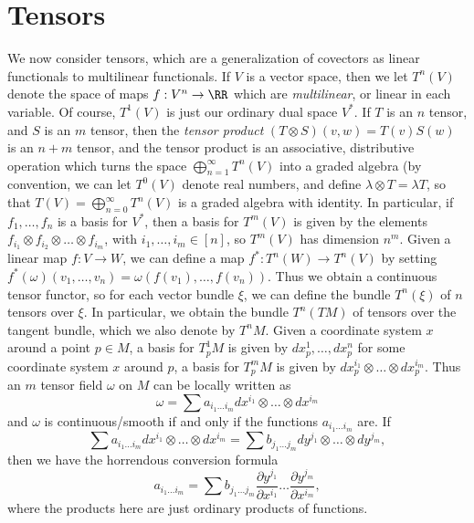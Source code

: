 \section{Tensors}

We now consider tensors, which are a generalization of covectors as linear functionals to multilinear functionals. If $V$ is a vector space, then we let $T^n(V)$ denote the space of maps $f: V^n \to \RR$ which are {\it multilinear}, or linear in each variable. Of course, $T^1(V)$ is just our ordinary dual space $V^*$. If $T$ is an $n$ tensor, and $S$ is an $m$ tensor, then the {\it tensor product} $(T \otimes S)(v,w) = T(v)S(w)$ is an $n + m$ tensor, and the tensor product is an associative, distributive operation which turns the space $\bigoplus_{n = 1}^\infty T^n(V)$ into a graded algebra (by convention, we can let $T^0(V)$ denote real numbers, and define $\lambda \otimes T = \lambda T$, so that $T(V) = \bigoplus_{n = 0}^\infty T^n(V)$ is a graded algebra with identity. In particular, if $f_1, \dots, f_n$ is a basis for $V^*$, then a basis for $T^m(V)$ is given by the elements $f_{i_1} \otimes f_{i_2} \otimes \dots \otimes f_{i_m}$, with $i_1, \dots, i_m \in [n]$, so $T^m(V)$ has dimension $n^m$. Given a linear map $f: V \to W$, we can define a map $f^*: T^n(W) \to T^n(V)$ by setting $f^*(\omega)(v_1, \dots, v_n) = \omega(f(v_1), \dots, f(v_n))$. Thus we obtain a continuous tensor functor, so for each vector bundle $\xi$, we can define the bundle $T^n(\xi)$ of $n$ tensors over $\xi$. In particular, we obtain the bundle $T^n(TM)$ of tensors over the tangent bundle, which we also denote by $T^nM$. Given a coordinate system $x$ around a point $p \in M$, a basis for $T^1_p M$ is given by $dx^1_p, \dots, dx^n_p$ for some coordinate system $x$ around $p$, a basis for $T^m_pM$ is given by $dx^{i_1}_p \otimes \dots \otimes dx^{i_m}_p$. Thus an $m$ tensor field $\omega$ on $M$ can be locally written as
%
\[ \omega = \sum a_{i_1 \dots i_m} dx^{i_1} \otimes \dots \otimes dx^{i_m} \]
%
and $\omega$ is continuous/smooth if and only if the functions $a_{i_1 \dots i_m}$ are. If
%
\[ \sum a_{i_1 \dots i_m} dx^{i_1} \otimes \dots \otimes dx^{i_m} = \sum b_{j_1 \dots j_m} dy^{j_1} \otimes \dots \otimes dy^{j_m}, \]
%
then we have the horrendous conversion formula
%
\[ a_{i_1 \dots i_m} = \sum b_{j_1 \dots j_m} \frac{\partial y^{j_1}}{\partial x^{i_1}} \dots \frac{\partial y^{j_m}}{\partial x^{i_m}}, \]
%
where the products here are just ordinary products of functions.

